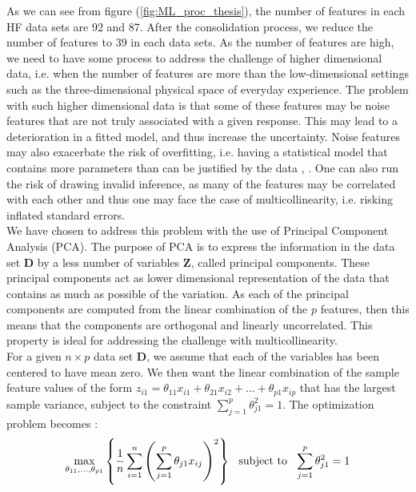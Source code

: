 \documentclass[../thesis.tex]{subfiles}
\begin{document}
\noindent As we can see from figure (\ref{fig:ML_proc_thesis}), the number of features in each HF data sets are 92 and 87. After the consolidation process, we reduce the number of features to 39 in each data sets. As the number of features are high, we need to have some process to address the challenge of higher dimensional data, i.e. when the number of features are more than the low-dimensional settings such as the three-dimensional physical space of everyday experience. The problem with such higher dimensional data is that some of these features may be noise features that are not truly associated with a given response. This may lead to a deterioration in a fitted model, and thus increase the uncertainty. Noise features may also exacerbate the risk of overfitting, i.e. having a statistical model that contains more parameters than can be justified by the data \citep{friedman2009elements}, \citep{james2013introduction}. One can also run the risk of drawing invalid inference, as many of the features may be correlated with each other and thus one may face the case of multicollinearity, i.e. risking inflated standard errors.\\
\indent We have chosen to address this problem with the use of Principal Component Analysis (PCA). The purpose of PCA is to express the information in the data set $\mathbf{D}$ by a less number of variables $\mathbf{Z}$, called principal components. These principal components act as lower dimensional representation of the data that contains as much as possible of the variation. As each of the principal components are computed from the linear combination of the $p$ features, then this means that the components are orthogonal and linearly uncorrelated. This property is ideal for addressing the challenge with multicollinearity.\\
\indent For a given $n \times p$ data set $\mathbf{D}$, we assume that each of the variables has been centered to have mean zero. We then want the linear combination of the sample feature values of the form $z_{i1} = \theta_{11}x_{i1} + \theta_{21}x_{i2} + \hdots + \theta_{p1}x_{ip}$ that has the largest sample variance, subject to the constraint $\sum_{j = 1}^p \theta_{j1}^2 = 1$. The optimization problem becomes \citep{james2013introduction}:
\begin{align}
    \max_{\theta_{11}, \hdots, \theta_{p1}} \left\{\frac{1}{n} \sum_{i=1}^n \left(\sum_{j=1}^p \theta_{j1}x_{ij} \right)^2 \right\} \hspace{0,25cm} \text{subject to} \hspace{0,25cm} \sum_{j=1}^p\theta^2_{j1} = 1
\end{align}
\end{document}
